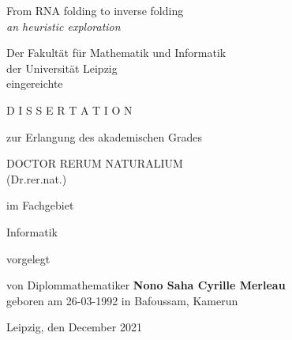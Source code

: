 \thispagestyle{empty}
{\Large
\begin{center}
	From RNA folding to  inverse folding\\
	\textit{an heuristic exploration}
\end{center}}
\vspace*{0.7cm}
\begin{center}
Der Fakult\"at f\"ur Mathematik und Informatik\\
der Universit\"at Leipzig\\
eingereichte
\end{center}
\vspace*{0.7cm}
\begin{center}
D I S S E R T A T I O N
\end{center}
\vspace*{0.7cm}
\begin{center}
zur Erlangung des akademischen Grades
\end{center}

\begin{center}
DOCTOR RERUM NATURALIUM\\
(Dr.rer.nat.)
\end{center}
\vspace*{0.5cm}
\begin{center}
im Fachgebiet 
\end{center}
\begin{center}
Informatik
\end{center}
\begin{center}
vorgelegt 
\end{center}
\vspace*{0.7cm}
\begin{center}
von Diplommathematiker \textbf{Nono Saha Cyrille Merleau}\\
geboren am 26-03-1992 \hspace{0em} in Bafoussam, Kamerun
\end{center}
\vspace{1cm}

\begin{center}
Leipzig, den {December 2021}
\end{center}



